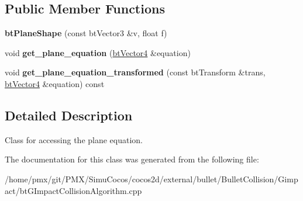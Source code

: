 \subsection*{Public Member Functions}
\begin{DoxyCompactItemize}
\item 
\mbox{\label{classbtPlaneShape_afc43ce148f1bb703e8a84cc755f2095d}} 
{\bfseries bt\+Plane\+Shape} (const bt\+Vector3 \&v, float f)
\item 
\mbox{\label{classbtPlaneShape_af56b67de4a14264bae787e92f9cb488c}} 
void {\bfseries get\+\_\+plane\+\_\+equation} (\hyperlink{classbtVector4}{bt\+Vector4} \&equation)
\item 
\mbox{\label{classbtPlaneShape_aa1abfa4d9d4e05bd35afced6c6a5e731}} 
void {\bfseries get\+\_\+plane\+\_\+equation\+\_\+transformed} (const bt\+Transform \&trans, \hyperlink{classbtVector4}{bt\+Vector4} \&equation) const
\end{DoxyCompactItemize}


\subsection{Detailed Description}
Class for accessing the plane equation. 

The documentation for this class was generated from the following file\+:\begin{DoxyCompactItemize}
\item 
/home/pmx/git/\+P\+M\+X/\+Simu\+Cocos/cocos2d/external/bullet/\+Bullet\+Collision/\+Gimpact/bt\+G\+Impact\+Collision\+Algorithm.\+cpp\end{DoxyCompactItemize}

